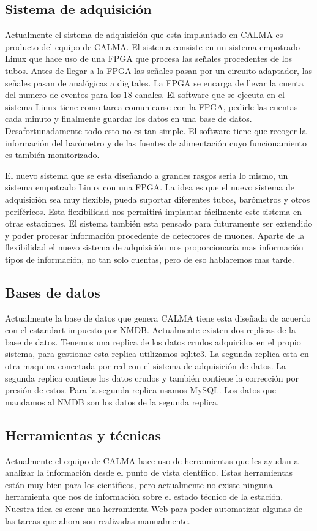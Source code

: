 	\subsection{Sistema de adquisición}
		Actualmente el sistema de adquisición que esta implantado en CALMA es producto del equipo de CALMA. El sistema consiste en un sistema empotrado
		Linux que hace uso de una FPGA que procesa las señales procedentes de los tubos. Antes de llegar a la FPGA las señales pasan por un circuito 
		adaptador, las señales pasan de analógicas a digitales. La FPGA se encarga de llevar la cuenta del numero de eventos para los 18 canales. El 
		software que se ejecuta en el sistema Linux tiene como tarea comunicarse con la FPGA, pedirle las cuentas cada minuto y finalmente guardar los
		datos en una base de datos. Desafortunadamente todo esto no es tan simple. El software tiene que recoger la información del barómetro y de las
		fuentes de alimentación cuyo funcionamiento es también monitorizado. 
		\par 
		El nuevo sistema que se esta diseñando a grandes rasgos seria lo mismo, un sistema empotrado Linux con una FPGA. La idea es que el nuevo sistema
		de adquisición sea muy flexible, pueda suportar diferentes tubos, barómetros y otros periféricos. Esta flexibilidad nos permitirá implantar 
		fácilmente este sistema en otras estaciones. El sistema también esta pensado para futuramente ser extendido y poder procesar información 
		procedente de detectores de muones. Aparte de la flexibilidad el nuevo sistema de adquisición nos proporcionaría mas información tipos de 
		información, no tan solo cuentas, pero de eso hablaremos mas tarde. 
	\subsection{Bases de datos}
		Actualmente la base de datos que genera CALMA tiene esta diseñada de acuerdo con el estandart impuesto por NMDB. Actualmente existen dos replicas
		de la base de datos. Tenemos una replica de los datos crudos adquiridos en el propio sistema, para gestionar esta replica utilizamos sqlite3. La
		segunda replica esta en otra maquina conectada por red con el sistema de adquisición de datos. La segunda replica contiene los datos crudos y 
		también contiene la corrección por presión de estos. Para la segunda replica usamos MySQL. Los datos que mandamos al NMDB son los datos de la 
		segunda replica.
	\subsection{Herramientas y técnicas}
		Actualmente el equipo de CALMA hace uso de herramientas que les ayudan a analizar la información desde el punto de vista científico. Estas 
		herramientas están muy bien para los científicos, pero actualmente no existe ninguna herramienta que nos de información sobre el estado técnico 
		de la estación. Nuestra idea es crear una herramienta Web para poder automatizar algunas de las tareas que ahora son realizadas manualmente. 


